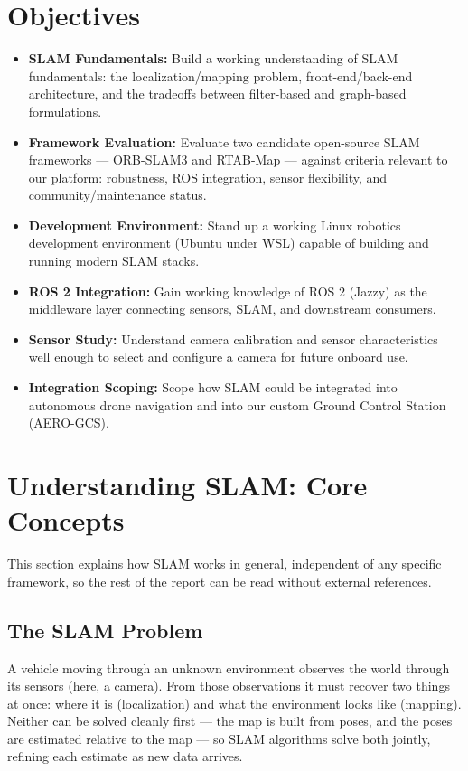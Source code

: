 \documentclass[11pt,a4paper]{article}
\begin{document}
\section{Objectives}
\begin{itemize}
    \item \textbf{SLAM Fundamentals:} Build a working understanding of SLAM fundamentals: the localization/mapping problem, front-end/back-end architecture, and the tradeoffs between filter-based and graph-based formulations.
    \item \textbf{Framework Evaluation:} Evaluate two candidate open-source SLAM frameworks --- ORB-SLAM3 and RTAB-Map --- against criteria relevant to our platform: robustness, ROS integration, sensor flexibility, and community/maintenance status.
    \item \textbf{Development Environment:} Stand up a working Linux robotics development environment (Ubuntu under WSL) capable of building and running modern SLAM stacks.
    \item \textbf{ROS 2 Integration:} Gain working knowledge of ROS 2 (Jazzy) as the middleware layer connecting sensors, SLAM, and downstream consumers.
    \item \textbf{Sensor Study:} Understand camera calibration and sensor characteristics well enough to select and configure a camera for future onboard use.
    \item \textbf{Integration Scoping:} Scope how SLAM could be integrated into autonomous drone navigation and into our custom Ground Control Station (AERO-GCS).
\end{itemize}

\newpage

\section{Understanding SLAM: Core Concepts}
\label{sec:concepts}
This section explains how SLAM works in general, independent of any specific framework, so the rest of the report can be read without external references.

\subsection{The SLAM Problem}
A vehicle moving through an unknown environment observes the world through its sensors (here, a camera). From those observations it must recover two things at once: where it is (localization) and what the environment looks like (mapping). Neither can be solved cleanly first --- the map is built from poses, and the poses are estimated relative to the map --- so SLAM algorithms solve both jointly, refining each estimate as new data arrives.
\end{document}
